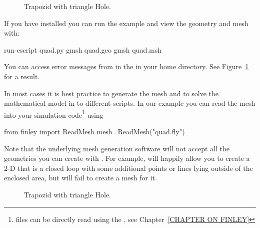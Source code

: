 \begin{figure}
\caption{Trapozid with triangle Hole.}
\label{fig:PYCAD 0}
\end{figure}

If you have \gmshextern installed you can run the example and view the geometry and mesh with:
\begin{python}
run-escript quad.py
gmsh quad.geo
gmsh quad.msh
\end{python}
You can access error messages from \gmshextern in the  in your home directory.
See Figure~\ref{fig:PYCAD 0} for a result.

In most cases it is best practice to generate the mesh and to solve the mathematical
model in to different scripts. In our example you can read the \finley mesh into your simulation
code\footnote{\gmshextern files can be directly read using the , see Chapter~\ref{CHAPTER ON FINLEY}} using
\begin{python}
from finley import ReadMesh
mesh=ReadMesh("quad.fly")
\end{python}
Note that the underlying mesh generation software will not accept all
the geometries you can create with \pycad.  For example, \pycad
will happily allow you to create a 2-D  that is a
closed loop with some additional points or lines lying outside of the
enclosed area, but \gmshextern will fail to create a mesh for it.

\begin{figure}
\caption{Trapozid with triangle Hole.}
\label{fig:PYCAD 1}
\end{figure}


